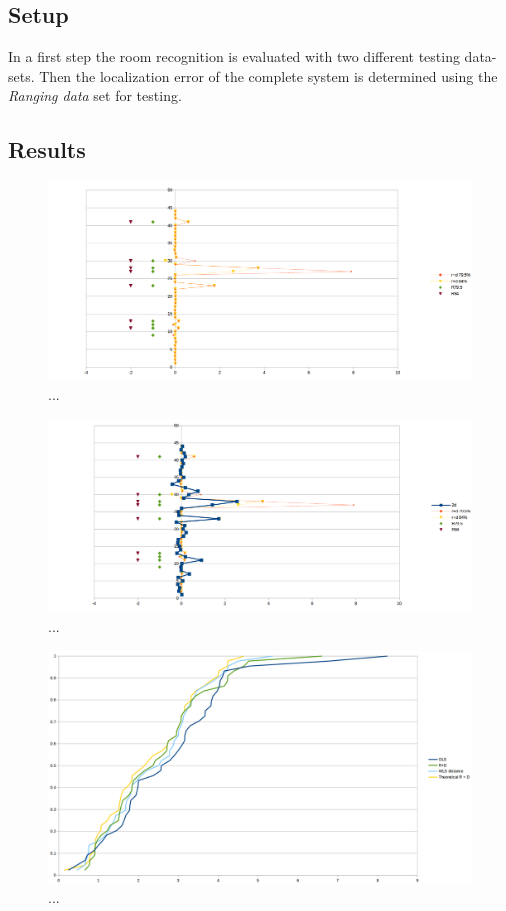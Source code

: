 \subsection{Setup}
In a first step the room recognition is evaluated with two different testing data-sets. Then the localization error of the complete system is determined using the \emph{Ranging data} set for testing.

\subsection{Results}

\begin{figure}[htp]

\label{fig:SVM}
\centering
\includegraphics[width=\textwidth]{Figures/Difference1.png}
\decoRule
\caption[...]{...}

\end{figure}
\begin{figure}[htp]

\label{fig:SVM}
\centering
\includegraphics[width=\textwidth]{Figures/Difference2.png}
\decoRule
\caption[...]{...}

\end{figure}
\begin{figure}[htp]

\label{fig:SVM}
\centering
\includegraphics[width=\textwidth]{Figures/final.png}
\decoRule
\caption[...]{...}

\end{figure}

